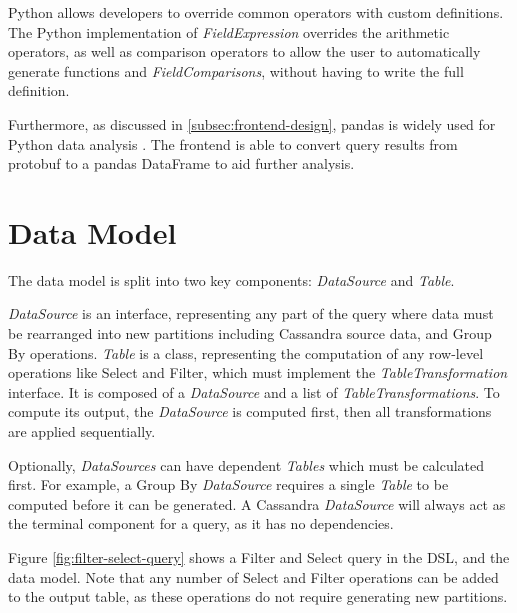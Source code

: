 Python allows developers to override common operators with custom definitions. The Python implementation of \textit{FieldExpression} overrides the arithmetic operators, as well as comparison operators to allow the user to automatically generate functions and \textit{FieldComparisons}, without having to write the full definition. %

Furthermore, as discussed in \ref{subsec:frontend-design}, pandas is widely used for Python data analysis \cite{reback2020pandas}. The frontend is able to convert query results from protobuf to a pandas DataFrame to aid further analysis.



\section{Data Model}\label{subsec:data-model}
The data model is split into two key components: \textit{DataSource} and \textit{Table}. 

\textit{DataSource} is an interface, representing any part of the query where data must be rearranged into new partitions including Cassandra source data, and Group By operations. \textit{Table} is a class, representing the computation of any row-level operations like Select and Filter, which must implement the \textit{TableTransformation} interface. It is composed of a \textit{DataSource} and a list of \textit{TableTransformations}. To compute its output, the \textit{DataSource} is computed first, then all transformations are applied sequentially.

Optionally, \textit{DataSources} can have dependent \textit{Tables} which must be calculated first. For example, a Group By \textit{DataSource} requires a single \textit{Table} to be computed before it can be generated. A Cassandra \textit{DataSource} will always act as the terminal component for a query, as it has no dependencies.

Figure \ref{fig:filter-select-query} shows a Filter and Select query in the DSL, and the data model. Note that any number of Select and Filter operations can be added to the output table, as these operations do not require generating new partitions.

